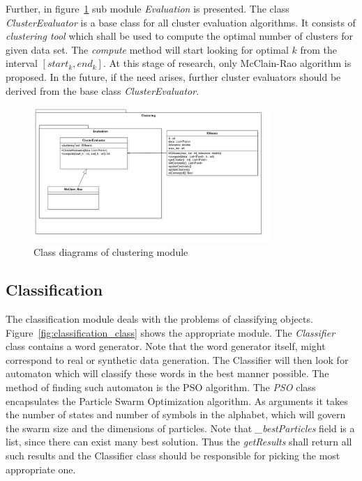 \documentclass{article}
\begin{document}
Further, in figure~\ref{fig:clustering_class} sub module \textit{Evaluation} is presented. The class \textit{ClusterEvaluator} is a base class for all cluster evaluation algorithms. It consists of \textit{clustering tool} which shall be used to compute the optimal number of clusters for given data set. The \textit{compute} method will start looking for optimal $k$ from the interval $[start_k, end_k]$. At this stage of research, only McClain-Rao algorithm is proposed. In the future, if the need arises, further cluster evaluators should be derived from the base class \textit{ClusterEvaluator}.

%
%
\begin{figure}[H]
	\centering
	\includegraphics[width=0.8\textwidth]{images/clustering_class.jpg}
    \caption{Class diagrams of clustering module}
    \label{fig:clustering_class}
\end{figure}



\newpage
\subsection{Classification}

The classification module deals with the problems of classifying objects. Figure~\ref{fig:classification_class} shows the appropriate module. The \textit{Classifier} class contains a word generator. Note that the word generator itself, might correspond to real or synthetic data generation. The Classifier will then look for automaton which will classify these words in the best manner possible. The method of finding such automaton is the PSO algorithm. The \textit{PSO} class encapsulates the Particle Swarm Optimization algorithm. As arguments it takes the number of states and number of symbols in the alphabet, which will govern the swarm size and the dimensions of particles. Note that \textit{\_bestParticles} field is a list, since there can exist many best solution. Thus the \textit{getResults} shall return all such results and the Classifier class should be responsible for picking the most appropriate one.
\end{document}

